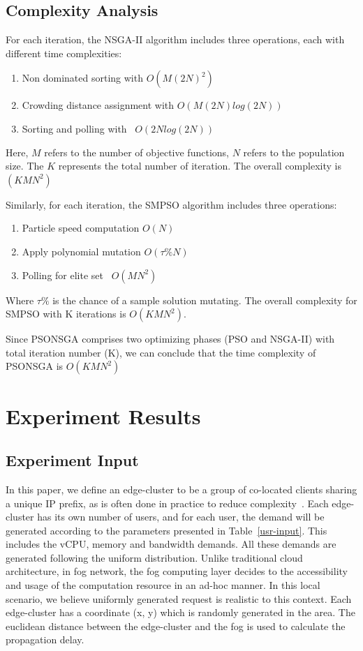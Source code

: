 \documentclass[10pt,journal,compsoc]{IEEEtran}
\begin{document}
\subsection{Complexity Analysis}
For each iteration, the NSGA-II algorithm includes three operations, each with different time complexities:
\begin{enumerate}
\item  Non dominated sorting with $O(M(2N)^2)$
\item Crowding distance assignment with
$O(M(2N)log(2N))$

\item Sorting and polling with ~$O(2N log(2N))$
\end{enumerate}
Here, $M$ refers to the number of objective functions, $N$ refers to the population size.
The $K$ represents the total number of iteration. The overall complexity is $(KMN^2)$ 

Similarly, for each iteration, the SMPSO algorithm includes three operations:
\begin{enumerate}
\item  Particle speed computation $O(N)$
\item  Apply polynomial mutation $O(\tau\% N)$
\item Polling for elite set ~$O(MN^2)$
\end{enumerate}
Where $\tau\%$ is the chance of a sample solution mutating.
The overall complexity for SMPSO with K iterations is $O(KMN^2)$.

Since PSONSGA comprises two optimizing phases (PSO and NSGA-II) with total iteration number (K), we can conclude that the time complexity of PSONSGA is $O(KMN^2)$

\section{Experiment Results}\label{express}

\subsection{Experiment Input}
In this paper, we define an edge-cluster to be a group of co-located clients sharing a unique IP prefix, as is often done in practice to reduce complexity~\cite{nygren2010akamai}. Each edge-cluster has its own number of users, and for each user, the demand will be generated according to the parameters presented in Table~\ref{usr-input}. This includes the vCPU, memory and bandwidth demands. All these demands are generated following the uniform distribution. Unlike traditional cloud architecture, in fog network, the fog computing layer decides to the accessibility and usage of the computation resource in an ad-hoc manner. In this local scenario, we believe uniformly generated request is realistic to this context. Each edge-cluster has a coordinate (x, y) which is randomly generated in the area. The euclidean distance between the edge-cluster and the fog is used to calculate the propagation delay.
\end{document}

